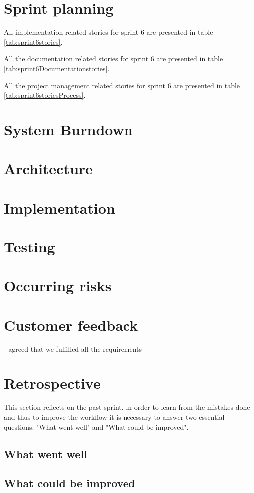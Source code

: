 \section{Sprint planning}
All implementation related stories for sprint 6 are presented in table \ref{tab:sprint6stories}.


All the documentation related stories for sprint 6 are presented in table \ref{tab:sprint6Documentationstories}.


All the project management related stories for sprint 6 are presented in table \ref{tab:sprint6storiesProcess}.

\section{System Burndown}
\section{Architecture}
\section{Implementation}
\section{Testing}
\section{Occurring risks}
\section{Customer feedback}
- agreed that we fulfilled all the requirements

\section{Retrospective}
This section reflects on the past sprint. In order to learn from the mistakes done and thus to improve the workflow it is necessary to answer two essential questions: "What went well" and "What could be improved".

\subsection{What went well}
\subsection{What could be improved}
